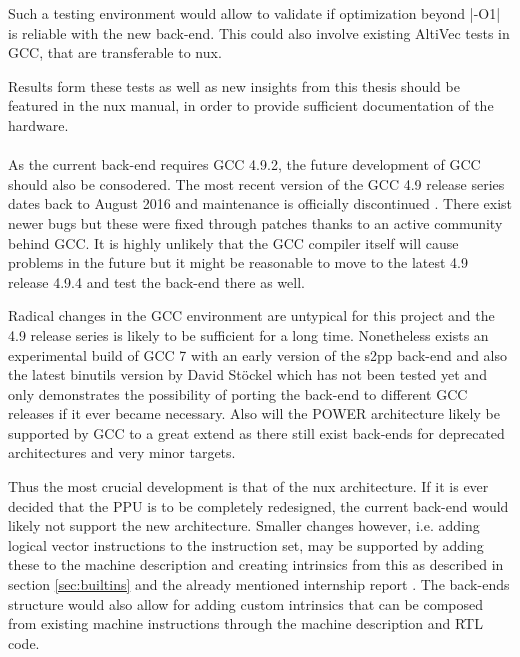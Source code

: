Such a testing environment would allow to validate if optimization beyond |-O1| is reliable with the new back-end.
This could also involve existing AltiVec tests in GCC, that are transferable to nux.

Results form these tests as well as new insights from this thesis should be featured in the nux manual, in order to provide sufficient documentation of the hardware.
\\
\\
As the current back-end requires GCC 4.9.2, the future development of GCC should also be consodered.
The most recent version of the GCC 4.9 release series dates back to August 2016 and maintenance is officially discontinued \cite{GCCweb}.
There exist newer bugs but these were fixed through patches thanks to an active community behind GCC.
It is highly unlikely that the GCC compiler itself will cause problems in the future but it might be reasonable to move to the latest 4.9 release 4.9.4 and test the back-end there as well.

Radical changes in the GCC environment are untypical for this project and the 4.9 release series is likely to be sufficient for a long time. 
Nonetheless exists an experimental build of GCC 7 with an early version of the s2pp back-end and also the latest binutils version by David Stöckel which has not been tested yet and only demonstrates the possibility of porting the back-end to different GCC releases if it ever became necessary.
Also will the POWER architecture likely be supported by GCC to a great extend as there still exist back-ends for deprecated architectures and very minor targets.

Thus the most crucial development is that of the nux architecture.
If it is ever decided that the  \ac{PPU} is to be completely redesigned, the current back-end would likely not support the new architecture.
Smaller changes however, i.e. adding logical vector instructions to the instruction set, may be supported by adding these to the machine description and creating intrinsics from this as described in section \ref{sec:builtins} and the already mentioned internship report \citep{heimbrecht_2017internship}.
The back-ends structure would also allow for adding custom intrinsics that can be composed from existing machine instructions through the machine description and \ac{RTL} code.

